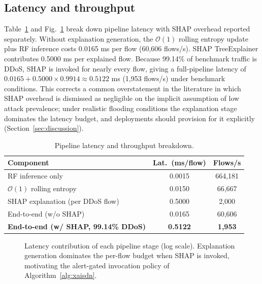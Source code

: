 ﻿\documentclass[review,12pt]{elsarticle}
\begin{document}
\subsection{Latency and throughput}
Table~\ref{tab:latency} and Fig.~\ref{fig:latency} break down pipeline latency with SHAP overhead reported separately. Without explanation generation, the $\mathcal{O}(1)$ rolling entropy update plus RF inference costs 0.0165 ms per flow (60,606 flows/s). SHAP TreeExplainer contributes 0.5000 ms per explained flow. Because 99.14\% of benchmark traffic is DDoS, SHAP is invoked for nearly every flow, giving a full-pipeline latency of $0.0165 + 0.5000 \times 0.9914 \approx 0.5122$ ms (1,953 flows/s) under benchmark conditions. This corrects a common overstatement in the literature in which SHAP overhead is dismissed as negligible on the implicit assumption of low attack prevalence; under realistic flooding conditions the explanation stage dominates the latency budget, and deployments should provision for it explicitly (Section~\ref{sec:discussion}).

\begin{table}[!t]
\centering
\caption{Pipeline latency and throughput breakdown.}
\label{tab:latency}
\small
\setlength{\tabcolsep}{4pt}
\begin{tabular}{@{}lcc@{}}
\toprule
\textbf{Component} & \textbf{Lat.\ (ms/flow)} & \textbf{Flows/s} \\
\midrule
RF inference only & 0.0015 & 664,181 \\
$\mathcal{O}(1)$ rolling entropy & 0.0150 & 66,667 \\
SHAP explanation (per DDoS flow) & 0.5000 & 2,000 \\
End-to-end (w/o SHAP) & 0.0165 & 60,606 \\
\textbf{End-to-end (w/ SHAP, 99.14\% DDoS)} & \textbf{0.5122} & \textbf{1,953} \\
\bottomrule
\end{tabular}
\end{table}

\begin{figure}[!t]
\centering
{}
\caption{Latency contribution of each pipeline stage (log scale). Explanation generation dominates the per-flow budget when SHAP is invoked, motivating the alert-gated invocation policy of Algorithm~\ref{alg:xaisdn}.}
\label{fig:latency}
\end{figure}
\end{document}
